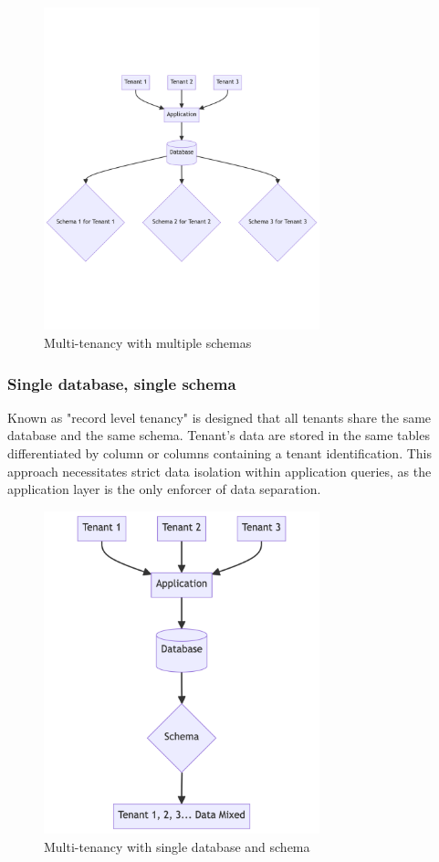 \begin{figure}[H]\centering
\includegraphics[width=80mm]{img/chap04/fig_multitenancy_multiple_schemas.png}
\caption{Multi-tenancy with multiple schemas}
\label{img04:multitenancy-multiple-schemas}
\end{figure}


\subsubsection{Single database, single schema}
\label{subsubsec:single-database-single-schema}
Known as "record level tenancy" is designed that all tenants share the same database and the same schema.
Tenant's data are stored in the same tables differentiated by column or columns containing a tenant identification.
This approach necessitates strict data isolation within application queries, as the application layer is the only enforcer of data separation.

\begin{figure}[H]\centering
\includegraphics[width=80mm]{img/chap04/fig_multitenancy_single_database_single_schema.png}
\caption{Multi-tenancy with single database and schema}
\label{img04:multitenancy-single-database-single-schema}
\end{figure}


